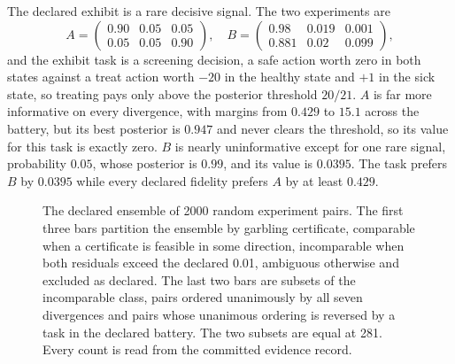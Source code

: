 \documentclass[aps,pre,reprint,nofootinbib]{revtex4-2}
\begin{document}
The declared exhibit is a rare decisive signal.  The two experiments
are
\begin{equation}
  A = \begin{pmatrix} 0.90 & 0.05 & 0.05\\
                      0.05 & 0.05 & 0.90 \end{pmatrix},
  \quad
  B = \begin{pmatrix} 0.98 & 0.019 & 0.001\\
                      0.881 & 0.02 & 0.099 \end{pmatrix},
  \label{eq:exhibit}
\end{equation}
and the exhibit task is a screening decision, a safe action worth
zero in both states against a treat action worth $-20$ in the healthy
state and $+1$ in the sick state, so treating pays only above the
posterior threshold $20/21$.  $A$ is far more informative on every
divergence, with margins from $0.429$ to $15.1$ across the battery,
but its best posterior is $0.947$ and never clears the threshold, so
its value for this task is exactly zero.  $B$ is nearly
uninformative except for one rare signal, probability $0.05$, whose
posterior is $0.99$, and its value is $0.0395$.  The task prefers
$B$ by $0.0395$ while every declared fidelity prefers $A$ by at
least $0.429$.

\begin{figure}[t]
\centering
{}
\caption{The declared ensemble of 2000 random experiment pairs.  The
first three bars partition the ensemble by garbling certificate,
comparable when a certificate is feasible in some direction,
incomparable when both residuals exceed the declared 0.01, ambiguous
otherwise and excluded as declared.  The last two bars are subsets of
the incomparable class, pairs ordered unanimously by all seven
divergences and pairs whose unanimous ordering is reversed by a task
in the declared battery.  The two subsets are equal at 281.  Every
count is read from the committed evidence record.}
\label{fig:gd1}
\end{figure}
\end{document}
